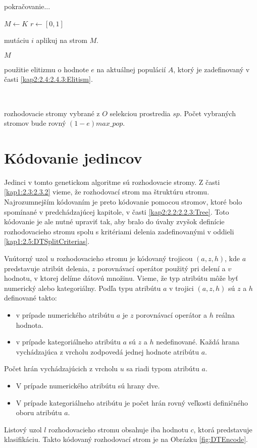 \begin{algorithm}
\ContinuedFloat
\caption{pokračovanie...}
\begin{algorithmic}[1]
\State $M \gets K$
\State $r \gets [0,1]$
	\State \parbox[t]{300pt}{mutáciu $i$ aplikuj na strom $M$.}
\EndIf
\State \Return $M$
\EndFor 
\EndFunction
\\
\State \Return \parbox[t]{300pt}{použitie elitizmu o hodnote $e$ na aktuálnej populácií $A$, ktorý je zadefinovaný v časti \ref{kap2:2.4:2.4.3:Elitism}. }
\EndFunction
\\
\State \Return \parbox[t]{300pt}{rozhodovacie stromy vybrané z $O$ selekciou prostredia $sp$. Počet vybraných stromov bude rovný $(1-e)max\_pop$.}
\EndFunction
\end{algorithmic}
\end{algorithm}

\section{Kódovanie jedincov}\label{kap3:3.2:Encoding}
Jedinci v tomto genetickom algoritme sú rozhodovacie stromy. Z časti \ref{kap1:2.3:2.3.2} vieme, že rozhodovací strom ma štruktúru stromu. Najrozumnejším kódovaním je preto kódovanie pomocou stromov, ktoré bolo spomínané v predchádzajúcej kapitole, v časti \ref{kap2:2.2:2.2.3:Tree}. Toto kódovanie je ale nutné upraviť tak, aby bralo do úvahy zvyšok definície rozhodovacieho stromu spolu s kritériami delenia zadefinovanými v oddieli \ref{kap1:2.5:DTSplitCriterias}.

Vnútorný uzol $u$ rozhodovacieho stromu je kódovaný trojicou $(a,z,h)$, kde $a$ predstavuje atribút delenia, $z$ porovnávací operátor použitý pri delení a $v$ hodnotu, v ktorej delíme dátovú množinu. Vieme, že typ atribútu môže byť numerický alebo kategoriálny. Podľa typu atribútu $a$ v trojici $(a,z,h)$ sú $z$ a $h$ definované takto:
\begin{itemize}
\item v prípade numerického atribútu $a$ je $z$ porovnávací operátor a $h$ reálna hodnota.
\item v prípade kategoriálneho atribútu $a$ sú $z$ a $h$ nedefinované. Každá hrana vychádzajúca z vrcholu zodpovedá jednej hodnote atribútu $a$.
\end{itemize}
Počet hrán vychádzajúcich z vrcholu $u$ sa riadi typom atribútu $a$.
\begin{itemize}
\item V prípade numerického atribútu sú hrany dve.
\item V prípade kategoriálneho atribútu je počet hrán rovný veľkosti definičného oboru atribútu $a$.
\end{itemize}
Listový uzol $l$ rozhodovacieho stromu obsahuje iba hodnotu $c$, ktorá predstavuje klasifikáciu.
Takto kódovaný rozhodovací strom je na Obrázku \ref{fig:DTEncode}.

